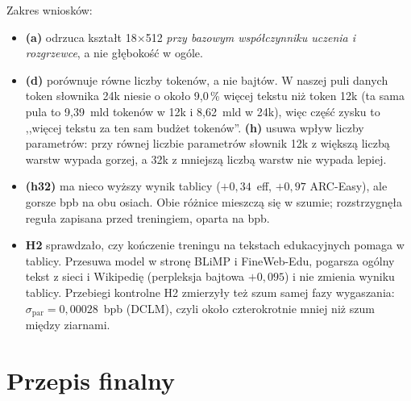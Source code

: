 Zakres wniosków:
\begin{itemize}
  \item \textbf{(a)} odrzuca kształt 18$\times$512 \emph{przy bazowym współczynniku uczenia i rozgrzewce}, a nie
  głębokość w ogóle.
  \item \textbf{(d)} porównuje równe liczby tokenów, a nie bajtów. W naszej puli danych token słownika 24k niesie o
  około 9,0\,\% więcej tekstu niż token 12k (ta sama pula to 9,39~mld tokenów w 12k i 8,62~mld w 24k), więc część
  zysku to ,,więcej tekstu za ten sam budżet tokenów''. \textbf{(h)} usuwa wpływ liczby parametrów: przy równej liczbie
  parametrów słownik 12k z większą liczbą warstw wypada gorzej, a 32k z mniejszą liczbą warstw nie wypada lepiej.
  \item \textbf{(h32)} ma nieco wyższy wynik tablicy ($+0{,}34$~eff, $+0{,}97$ ARC-Easy), ale gorsze bpb na obu osiach.
  Obie różnice mieszczą się w szumie; rozstrzygnęła reguła zapisana przed treningiem, oparta na bpb.
  \item \textbf{H2} sprawdzało, czy kończenie treningu na tekstach edukacyjnych pomaga w tablicy. Przesuwa model w
  stronę BLiMP i FineWeb-Edu, pogarsza ogólny tekst z sieci i Wikipedię (perpleksja bajtowa $+0{,}095$) i nie zmienia
  wyniku tablicy. Przebiegi kontrolne H2 zmierzyły też szum samej fazy wygaszania: $\sigma_{\mathrm{par}} =
  0{,}00028$~bpb (DCLM), czyli około czterokrotnie mniej niż szum między ziarnami.
\end{itemize}

\section{Przepis finalny}

